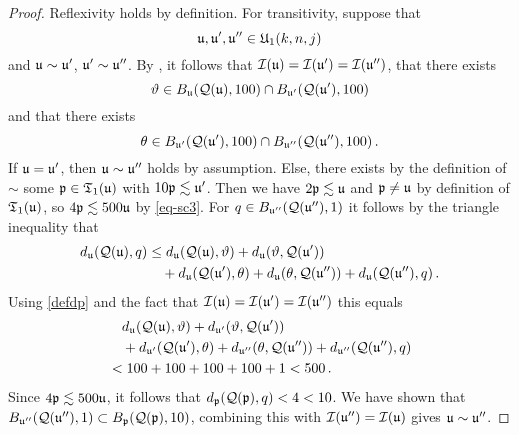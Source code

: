 \begin{proof}
    \leanok
    Reflexivity holds by definition.
    For transitivity, suppose that
    \begin{equation*}
        \fu, \fu', \fu'' \in \fU_1(k,n,j)
    \end{equation*}
    and $\fu \sim \fu'$, $\fu' \sim \fu''$.
    By , it follows that $\scI(\fu) =\scI(\fu') = \scI(\fu'')$, that there exists
    \begin{equation*}
        \mfa \in B_{\fu}(\fcc(\fu), 100) \cap B_{\fu'}(\fcc(\fu'), 100)
    \end{equation*}
    and that there exists
    \begin{equation*}
        \mfb \in B_{\fu'}(\fcc(\fu'), 100) \cap B_{\fu''}(\fcc(\fu''), 100)\, .
    \end{equation*}
    If $\fu = \fu'$, then $\fu \sim \fu''$ holds by assumption. Else, there exists by the definition of $\sim$ some $\fp \in \mathfrak{T}_1(\fu)$ with $10\fp\lesssim \fu'$.
    Then we have $2\fp \lesssim \fu$ and $\fp \ne \fu$ by definition of $\mathfrak{T}_1(\fu)$, so $4 \fp \lesssim 500 \fu$ by \eqref{eq-sc3}. For $q \in B_{\fu''}(\fcc(\fu''), 1)$ it follows by the triangle inequality that
    \begin{align*}
        d_{\fu}(\fcc(\fu), q) &\le d_{\fu}(\fcc(\fu), \mfa) + d_{\fu}(\mfa, \fcc(\fu'))\\
        &\quad+ d_{\fu}(\fcc(\fu'), \mfb) + d_{\fu}(\mfb, \fcc(\fu'')) +
        d_{\fu}(\fcc(\fu''), q)\,.
    \end{align*}
    Using \eqref{defdp} and the fact that $\scI(\fu) = \scI(\fu') = \scI(\fu'')$ this equals
    \begin{align*}
        &\quad d_{\fu}(\fcc(\fu), \mfa) + d_{\fu'}(\mfa, \fcc(\fu'))\\
        &\quad+ d_{\fu'}(\fcc(\fu'), \mfb) + d_{\fu''}(\mfb, \fcc(\fu'')) +
        d_{\fu''}(\fcc(\fu''), q)\\
        &< 100 + 100 + 100 + 100 + 1 < 500\,.
    \end{align*}
    Since $4\fp \lesssim 500 \fu$, it follows that $d_{\fp}(\fcc(\fp), q) < 4 < 10$. We have shown that $B_{\fu''}(\fcc(\fu''), 1) \subset B_{\fp}(\fcc(\fp), 10)$, combining this with $\scI(\fu'') = \scI(\fu)$ gives $\fu \sim \fu''$.


\end{proof}
